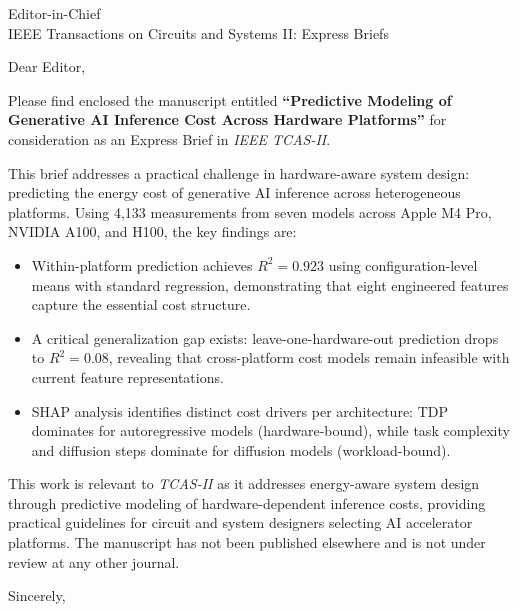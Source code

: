 \documentclass[11pt]{letter}
\begin{document}
\begin{letter}{Editor-in-Chief\\IEEE Transactions on Circuits and Systems II: Express Briefs}

\opening{Dear Editor,}

Please find enclosed the manuscript entitled \textbf{``Predictive Modeling of Generative AI Inference Cost Across Hardware Platforms''} for consideration as an Express Brief in \textit{IEEE TCAS-II}.

This brief addresses a practical challenge in hardware-aware system design: predicting the energy cost of generative AI inference across heterogeneous platforms. Using 4,133 measurements from seven models across Apple M4 Pro, NVIDIA A100, and H100, the key findings are:

\begin{itemize}
\item Within-platform prediction achieves $R^2{=}0.923$ using configuration-level means with standard regression, demonstrating that eight engineered features capture the essential cost structure.
\item A critical generalization gap exists: leave-one-hardware-out prediction drops to $R^2{=}0.08$, revealing that cross-platform cost models remain infeasible with current feature representations.
\item SHAP analysis identifies distinct cost drivers per architecture: TDP dominates for autoregressive models (hardware-bound), while task complexity and diffusion steps dominate for diffusion models (workload-bound).
\end{itemize}

This work is relevant to \textit{TCAS-II} as it addresses energy-aware system design through predictive modeling of hardware-dependent inference costs, providing practical guidelines for circuit and system designers selecting AI accelerator platforms. The manuscript has not been published elsewhere and is not under review at any other journal.

\closing{Sincerely,}

\end{letter}
\end{document}
